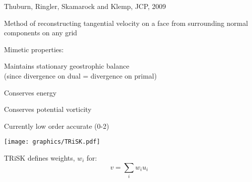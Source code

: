 \begin{slide}

Thuburn, Ringler, Skamarock and Klemp, JCP, 2009

\begin{list0}
\item Method of reconstructing tangential velocity on a face from surrounding normal components on any grid
\item Mimetic properties:
    \begin{list1}
    \item Maintains stationary geostrophic balance\\
        (since divergence on dual = divergence on primal)
    \item Conserves energy
    \item Conserves potential vorticity
    \end{list1}
\item Currently low order accurate (0-2)
\end{list0}

\begin{minipage}{0.4\linewidth}
\texttt{[image: graphics/TRiSK.pdf]}
\end{minipage}
\begin{minipage}{0.49\linewidth}\centering
TRiSK defines weights, $w_i$ for:
\[v = \sum_i w_i u_i\]
\end{minipage}
\end{slide}

